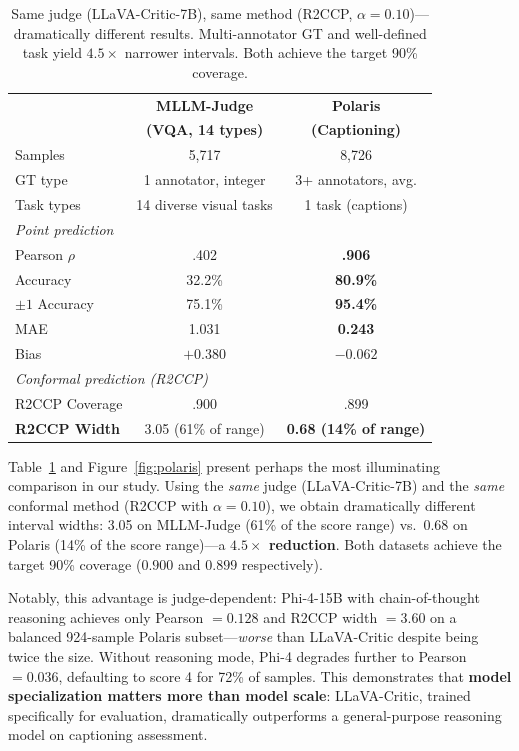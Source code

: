 \documentclass{article}
\begin{document}
\begin{table}[t]
\centering
\caption{Same judge (LLaVA-Critic-7B), same method (R2CCP, $\alpha=0.10$)---dramatically different results. Multi-annotator GT and well-defined task yield $4.5\times$ narrower intervals. Both achieve the target 90\% coverage.}
\label{tab:polaris}
\small
\begin{tabular}{lcc}
\toprule
& \textbf{MLLM-Judge} & \textbf{Polaris} \\
& \textbf{(VQA, 14 types)} & \textbf{(Captioning)} \\
\midrule
Samples & 5,717 & 8,726 \\
GT type & 1 annotator, integer & 3+ annotators, avg. \\
Task types & 14 diverse visual tasks & 1 task (captions) \\
\midrule
\multicolumn{3}{l}{\emph{Point prediction}} \\
Pearson $\rho$ & .402 & \textbf{.906} \\
Accuracy & 32.2\% & \textbf{80.9\%} \\
$\pm 1$ Accuracy & 75.1\% & \textbf{95.4\%} \\
MAE & 1.031 & \textbf{0.243} \\
Bias & $+0.380$ & $\mathbf{-0.062}$ \\
\midrule
\multicolumn{3}{l}{\emph{Conformal prediction (R2CCP)}} \\
R2CCP Coverage & .900 & .899 \\
\textbf{R2CCP Width} & 3.05 (61\% of range) & \textbf{0.68 (14\% of range)} \\
\bottomrule
\end{tabular}
\end{table}

Table~\ref{tab:polaris} and Figure~\ref{fig:polaris} present perhaps the most illuminating comparison in our study. Using the \emph{same} judge (LLaVA-Critic-7B) and the \emph{same} conformal method (R2CCP with $\alpha = 0.10$), we obtain dramatically different interval widths: 3.05 on MLLM-Judge (61\% of the score range) vs.\ 0.68 on Polaris (14\% of the score range)---a \textbf{$4.5\times$ reduction}. Both datasets achieve the target 90\% coverage ($0.900$ and $0.899$ respectively).

Notably, this advantage is judge-dependent: Phi-4-15B with chain-of-thought reasoning achieves only Pearson $= 0.128$ and R2CCP width $= 3.60$ on a balanced 924-sample Polaris subset---\emph{worse} than LLaVA-Critic despite being twice the size. Without reasoning mode, Phi-4 degrades further to Pearson $= 0.036$, defaulting to score 4 for 72\% of samples. This demonstrates that \textbf{model specialization matters more than model scale}: LLaVA-Critic, trained specifically for evaluation, dramatically outperforms a general-purpose reasoning model on captioning assessment.
\end{document}
